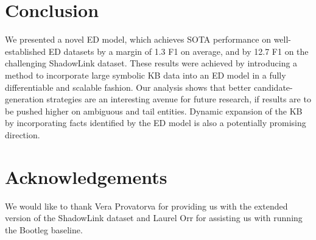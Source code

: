 \documentclass[11pt]{article}
\begin{document}
\section{Conclusion}
We presented a novel ED model, which achieves SOTA performance on well-established ED datasets by a margin of 1.3 F1 on average, and by 12.7 F1 on the challenging ShadowLink dataset. These results were achieved by introducing a method to incorporate large symbolic KB data into an ED model in a fully differentiable and scalable fashion. Our analysis shows that better candidate-generation strategies are an interesting avenue for future research, if results are to be pushed higher on ambiguous and tail entities. Dynamic expansion of the KB by incorporating facts identified by the ED model is also a potentially promising direction.







\section*{Acknowledgements}

We would like to thank Vera Provatorva for providing us with the extended version of the ShadowLink dataset and Laurel Orr for assisting us with running the Bootleg baseline.

\clearpage







\clearpage
\end{document}
